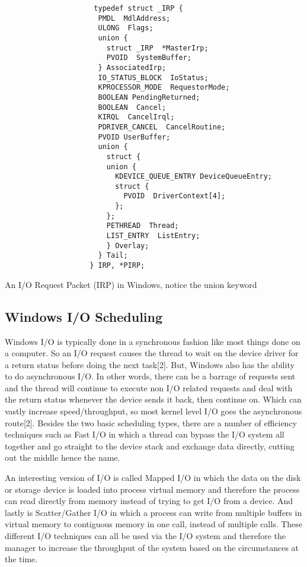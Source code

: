 \documentclass{article}
\begin{document}
                     \begin{lstlisting}
                     typedef struct _IRP {
                      PMDL  MdlAddress;
                      ULONG  Flags;
                      union {
                        struct _IRP  *MasterIrp;
                        PVOID  SystemBuffer;
                      } AssociatedIrp;
                      IO_STATUS_BLOCK  IoStatus;
                      KPROCESSOR_MODE  RequestorMode;
                      BOOLEAN PendingReturned;
                      BOOLEAN  Cancel;
                      KIRQL  CancelIrql;
                      PDRIVER_CANCEL  CancelRoutine;
                      PVOID UserBuffer;
                      union {
                        struct {
                        union {
                          KDEVICE_QUEUE_ENTRY DeviceQueueEntry;
                          struct {
                            PVOID  DriverContext[4];
                          };
                        };
                        PETHREAD  Thread;
                        LIST_ENTRY  ListEntry;
                        } Overlay;
                      } Tail;
                    } IRP, *PIRP;
                    \end{lstlisting}
                     An I/O Request Packet (IRP) in Windows, notice the union keyword \newline


\subsection{Windows I/O Scheduling}
    Windows I/O is typically done in a synchronous fashion like most things done on a computer. So an I/O request causes the thread to wait on the device driver for a return status before doing the next task[2].
    But, Windows also has the ability to do asynchronous I/O. In other words, there can be a barrage of requests sent and the thread will continue to execute non I/O related requests and deal with the return status whenever the device sends it back, then continue on. Which can vastly increase speed/throughput, so most kernel level I/O goes the asynchronous route[2].
    Besides the two basic scheduling types, there are a number of efficiency techniques such as Fast I/O in which a thread can bypass the I/O system all together and go straight to the device stack and exchange data directly, cutting out the middle hence the name.

    An interesting version of I/O is called Mapped I/O in which the data on the disk or storage device is loaded into process virtual memory and therefore the process can read directly from memory instead of trying to get I/O from a device. And lastly is Scatter/Gather I/O in which a process can write from multiple buffers in virtual memory to contiguous memory in one call, instead of multiple calls. These different I/O techniques can all be used via the I/O system and therefore the manager to increase the throughput of the system based on the circumstances at the time.
\end{document}

